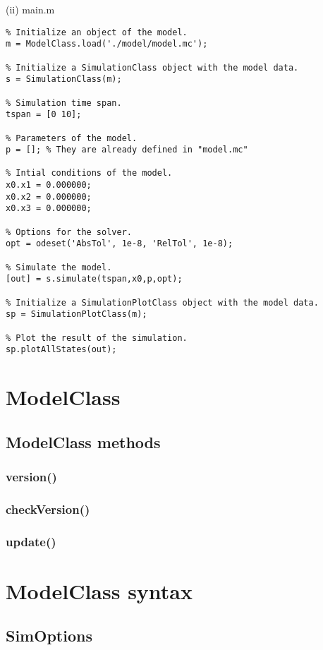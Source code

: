 \documentclass[11pt]{article}
\begin{document}
(ii) main.m

\begin{lstlisting}
% Initialize an object of the model.
m = ModelClass.load('./model/model.mc');

% Initialize a SimulationClass object with the model data.
s = SimulationClass(m);

% Simulation time span.
tspan = [0 10];

% Parameters of the model.
p = []; % They are already defined in "model.mc"

% Intial conditions of the model.
x0.x1 = 0.000000;
x0.x2 = 0.000000;
x0.x3 = 0.000000;

% Options for the solver.
opt = odeset('AbsTol', 1e-8, 'RelTol', 1e-8);

% Simulate the model.
[out] = s.simulate(tspan,x0,p,opt);

% Initialize a SimulationPlotClass object with the model data.
sp = SimulationPlotClass(m);

% Plot the result of the simulation.
sp.plotAllStates(out);
\end{lstlisting}

\section{ModelClass}

\subsection{ModelClass methods}

\subsubsection{version()}

\subsubsection{checkVersion()}

\subsubsection{update()}

\section{ModelClass syntax}

\subsection{SimOptions}
\end{document}
